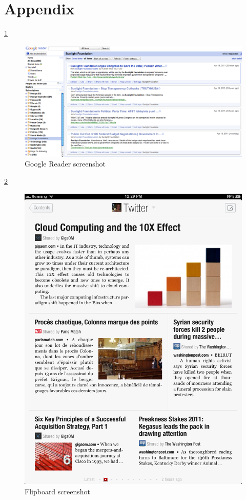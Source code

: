 \documentclass{acm_proc_10ptArticle-sp}
\begin{document}



\newpage

\onecolumn
\section{Appendix}

\ref{screenshot:reader}
\begin{figure}[H]
  \centering
  \includegraphics[width=0.9\linewidth]{img/Google-Reader.png}
  \caption{Google Reader screenshot}
  \label{screenshot:reader}
\end{figure}

\ref{screenshot:flipboard}
\begin{figure}[H]
  \centering
  \includegraphics[width=0.9\linewidth]{img/flipboard-screenshot.png}
  \caption{Flipboard screenshot}
  \label{screenshot:flipboard}
\end{figure}
\end{document}
